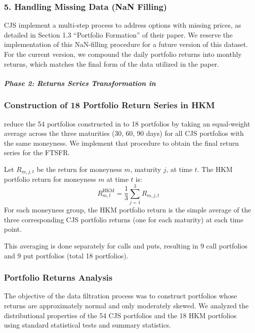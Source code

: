 \documentclass{article}
\begin{document}
\begin{appendices}
\subsubsection*{5. Handling Missing Data (NaN Filling)}

CJS implement a multi-step process to address options with missing prices, as detailed in Section 1.3 ``Portfolio Formation'' of their paper. We reserve the implementation of this NaN-filling procedure for a future version of this dataset. For the current version, we compound the daily portfolio returns into monthly returns, which matches the final form of the data utilized in the paper.


\paragraph{\textit{Phase 2: Returns Series Transformation in \citet{He2017}}}
\subsubsection*{Construction of 18 Portfolio Return Series in HKM}

\citet{He2017} reduce the 54 portfolios constructed in \citet{Constantinides2013} to 18 portfolios by taking an equal-weight average across the three maturities (30, 60, 90 days) for all CJS portfolios with the same moneyness. We implement that procedure to obtain the final return series for the FTSFR.

Let \( R_{m,j,t} \) be the return for moneyness \( m \), maturity \( j \), at time \( t \).
The HKM portfolio return for moneyness \( m \) at time \( t \) is:
\[
R_{m,t}^{\mathrm{HKM}} = \frac{1}{3} \sum_{j=1}^{3} R_{m,j,t}
\]
For each moneyness group, the HKM portfolio return is the simple average of the three corresponding CJS portfolio returns (one for each maturity) at each time point.

This averaging is done separately for calls and puts, resulting in 9 call portfolios and 9 put portfolios (total 18 portfolios).



\subsubsection*{Portfolio Returns Analysis}

The objective of the data filtration process was to construct portfolios whose returns are approximately normal and only moderately skewed. We analyzed the distributional properties of the 54 CJS portfolios and the 18 HKM portfolios using standard statistical tests and summary statistics.


\end{appendices}
\end{document}
